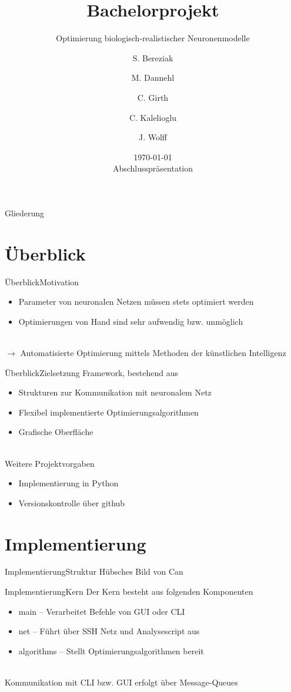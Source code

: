 \documentclass[ngerman,10pt,xcolor=colortbl,compress
]{beamer}
\title{Bachelorprojekt }
\subtitle{Optimierung biologisch-realistischer Neuronenmodelle}
\date[]{\today\\[1ex]Abschlusspräsentation}
\author[Bereziak \and Dannehl \and Girth \and Kalelioglu \and Wolff]{S. Bereziak \and M. Dannehl \and C. Girth \and C. Kalelioglu \and J. Wolff}
\institute[UzL]{Institut für Robotik und kognitive Systeme\\Universität zu Lübeck}
\begin{document}
	\maketitle
	\begin{frame}{Gliederung}
		\tableofcontents
	\end{frame}	
	\section{Überblick}
	\begin{frame}{Überblick}{Motivation}
	\begin{itemize}
	\item Parameter von neuronalen Netzen müssen stets optimiert werden
	\item Optimierungen von Hand sind sehr aufwendig bzw. unmöglich
	\end{itemize}
	\mbox{}\\
	$\rightarrow$ Automatisierte Optimierung mittels Methoden der künstlichen Intelligenz
	\end{frame}
	\begin{frame}{Überblick}{Zielsetzung}
	Framework, bestehend aus
	\begin{itemize}
		\item Strukturen zur Kommunikation mit neuronalem Netz
		\item Flexibel implementierte Optimierungsalgorithmen
		\item Grafische Oberfläche
	\end{itemize}
	\mbox{}\\
	Weitere Projektvorgaben
	\begin{itemize}
		\item Implementierung in Python
		\item Versionskontrolle über github
	\end{itemize}
	\end{frame}
	
	\section{Implementierung}
	
	\begin{frame}{Implementierung}{Struktur}
	Hübsches Bild von Can
	\end{frame}
	\begin{frame}{Implementierung}{Kern}
	Der Kern besteht aus folgenden Komponenten
	\begin{itemize}
		\item main -- Verarbeitet Befehle von GUI oder CLI
		\item net -- Führt über SSH Netz und Analysescript aus
		\item algorithms -- Stellt Optimierungsalgorithmen bereit 
	\end{itemize}
	\mbox{}\\
	Kommunikation mit CLI bzw. GUI erfolgt über Message-Queues
	\end{frame}
	
\end{document}
